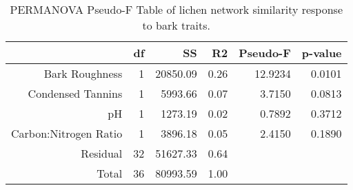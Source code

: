 
\begin{table}[ht]
\centering
\begin{tabular}{rrrrrr}
  \hline
 & df & SS & R2 & Pseudo-F & p-value \\ 
  \hline
Bark Roughness & 1 & 20850.09 & 0.26 & 12.9234 & 0.0101 \\ 
  Condensed Tannins & 1 & 5993.66 & 0.07 & 3.7150 & 0.0813 \\ 
  pH & 1 & 1273.19 & 0.02 & 0.7892 & 0.3712 \\ 
  Carbon:Nitrogen Ratio & 1 & 3896.18 & 0.05 & 2.4150 & 0.1890 \\ 
  Residual & 32 & 51627.33 & 0.64 &  &  \\ 
  Total & 36 & 80993.59 & 1.00 &  &  \\ 
   \hline
\end{tabular}
\caption{PERMANOVA Pseudo-F Table of lichen network similarity response to bark traits.} 
\label{tab:cn_trait_perm}
\end{table}
